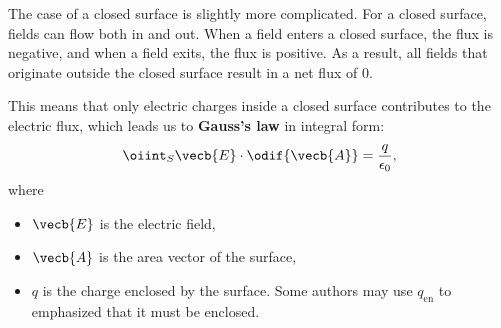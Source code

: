 The case of a closed surface is slightly more complicated.
For a closed surface, fields can flow both in and out.
When a field enters a closed surface, the flux is negative,
and when a field exits, the flux is positive.
As a result,
all fields that originate outside the closed surface result in a net flux of 0.

This means that only electric charges inside a closed surface
contributes to the electric flux,
which leads us to \textbf{Gauss's law} in integral form:
\begin{equation} \label{eq:gausss-law}
    \oiint_S \vecb{E} \cdot \odif{\vecb{A}} = \frac{q}{\epsilon_0},
\end{equation}
where
\begin{itemize}
    \item \(\vecb{E}\) is the electric field,
    \item \(\vecb{A}\) is the area vector of the surface,
    \item \(q\) is the charge enclosed by the surface.
        Some authors may use \(q_\mathrm{en}\)
        to emphasized that it must be enclosed.
\end{itemize}

